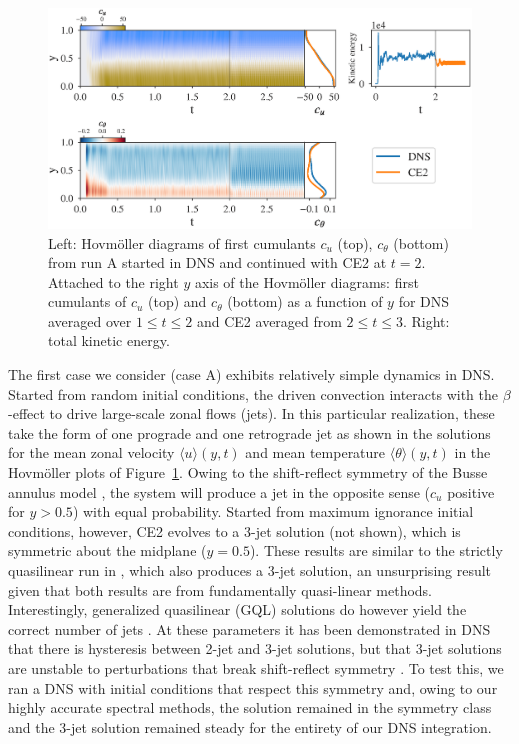 \documentclass{jfm}
\newcommand{\ct}{c_{\theta}}
\newcommand{\cu}{c_u}
\begin{document}
\begin{figure}
  \centering
  \includegraphics[width=\textwidth]{fig1.eps}
  \caption{Left: Hovm\"oller diagrams of first cumulants $\cu$ (top), $c_\theta$ (bottom) from run A started in DNS and continued with CE2 at $t=2$. Attached to the right $y$ axis of the Hovm\"oller diagrams: first cumulants of $\cu$ (top) and $\ct$ (bottom) as a function of $y$ for DNS averaged over $1 \le t \le 2$ and CE2 averaged from $2 \le t \le 3$. Right: total kinetic energy.}
  \label{fig:run_A}
\end{figure}

The first case we consider (case A) exhibits relatively simple dynamics in DNS. Started from random initial conditions, the driven convection interacts with the $\beta$-effect to drive large-scale zonal flows (jets). In this particular realization, these take the form of one prograde and one retrograde jet as shown in the solutions for the mean zonal velocity $\langle u \rangle(y, t)$ and mean temperature $\langle \theta\rangle(y,t) $ in the Hovm\"oller plots of Figure~\ref{fig:run_A}. 
Owing to the shift-reflect symmetry of the Busse annulus model \citep[e.g.]{bh1993}, the system will produce a jet in the opposite sense ($\cu$ positive for $y > 0.5$) with equal probability. 
Started from maximum ignorance initial conditions, however, CE2 evolves to a 3-jet solution (not shown), which is symmetric about the midplane ($y=0.5$). These results are similar to the strictly quasilinear run in \citet{tom_2018}, which also produces a 3-jet solution, an unsurprising result given that both results are from fundamentally quasi-linear methods. Interestingly, generalized quasilinear (GQL) solutions do however yield the correct number of jets \citep{tom_2018}. At these parameters it has been demonstrated in DNS that there is hysteresis between 2-jet and 3-jet solutions, but that 3-jet solutions are unstable to perturbations that break shift-reflect symmetry \citep{bh1993}. To test this, we ran a DNS with initial conditions that respect this symmetry and, owing to our highly accurate spectral methods, the solution remained in the symmetry class and the 3-jet solution remained steady for the entirety of our DNS integration.
\end{document}
